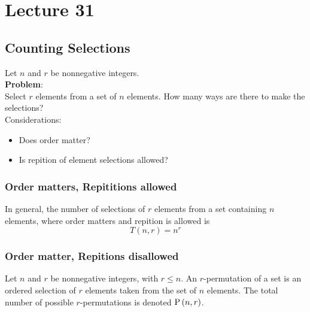 \documentclass{report}
\begin{document}
\section{Lecture 31}
\subsection*{Counting Selections}
Let $n$ and $r$ be nonnegative integers. \\

\textbf{Problem}:\\
Select $r$ elements from a set of $n$ elements. How many ways are there to make the selections? \\

Considerations:
\begin{itemize}
	\item Does order matter?
	\item Is repition of element selections allowed?
\end{itemize}

\subsubsection*{Order matters, Repititions allowed}
\Theom In general, the number of selections of $r$ elements from a set containing $n$ elements, where order matters and repition is allowed is
$$
	T(n,r) = n^r
$$
	
\subsubsection*{Order matter, Repitions disallowed}
 Let $n$ and $r$ be nonnegative integers, with $r\leq n$. An $r$-permutation of a set is an ordered selection of $r$ elements taken from the set of $n$ elements. The total number of possible $r$-permutations is denoted $\mathrm{P}\left( n, r \right)$. \\
\end{document}
